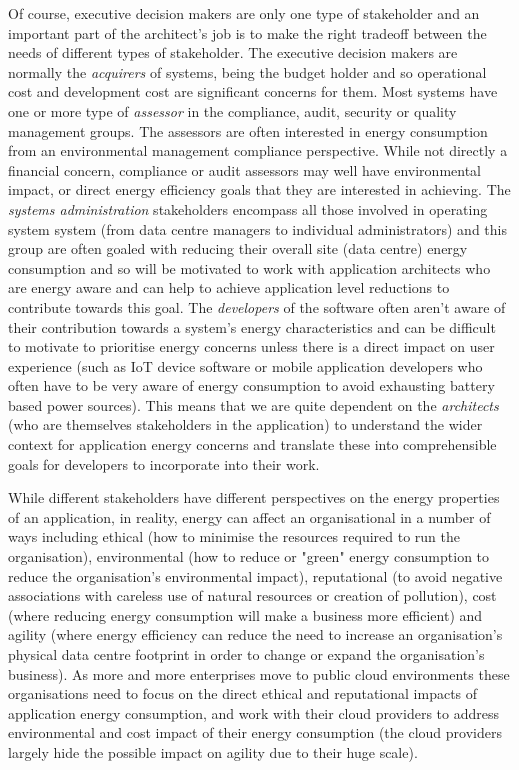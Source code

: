 Of course, executive decision makers are only one type of stakeholder and an important part of the architect's job is to make the right tradeoff between the needs of different types of stakeholder.  The executive decision makers are normally the \emph{acquirers} of systems, being the budget holder and so operational cost and development cost are significant concerns for them.  Most systems have one or more type of \emph{assessor} in the compliance, audit, security or quality management groups.  The assessors are often interested in energy consumption from an environmental management compliance perspective.  While not directly a financial concern, compliance or audit assessors may well have environmental impact, or direct energy efficiency goals that they are interested in achieving.  The \emph{systems administration} stakeholders encompass all those involved in operating system system (from data centre managers to individual administrators) and this group are often goaled with reducing their overall site (data centre) energy consumption and so will be motivated to work with application architects who are energy aware and can help to achieve application level reductions to contribute towards this goal.  The \emph{developers} of the software often aren't aware of their contribution towards a system's energy characteristics and can be difficult to motivate to prioritise energy concerns unless there is a direct impact on user experience (such as IoT device software or mobile application developers who often have to be very aware of energy consumption to avoid exhausting battery based power sources).  This means that we are quite dependent on the \emph{architects} (who are themselves stakeholders in the application) to understand the wider context for application energy concerns and translate these into comprehensible goals for developers to incorporate into their work.

While different stakeholders have different perspectives on the energy properties of an application, in reality, energy can affect an organisational in a number of ways including ethical (how to minimise the resources required to run the organisation), environmental (how to reduce or "green" energy consumption to reduce the organisation's environmental impact), reputational (to avoid negative associations with careless use of natural resources or creation of pollution), cost (where reducing energy consumption will make a business more efficient) and agility (where energy efficiency can reduce the need to increase an organisation's physical data centre footprint in order to change or expand the organisation's business).  As more and more enterprises move to public cloud environments \cite{idc2016-cloudreport} these organisations need to focus on the direct ethical and reputational impacts of application energy consumption, and work with their cloud providers to address environmental and cost impact of their energy consumption (the cloud providers largely hide the possible impact on agility due to their huge scale). 

